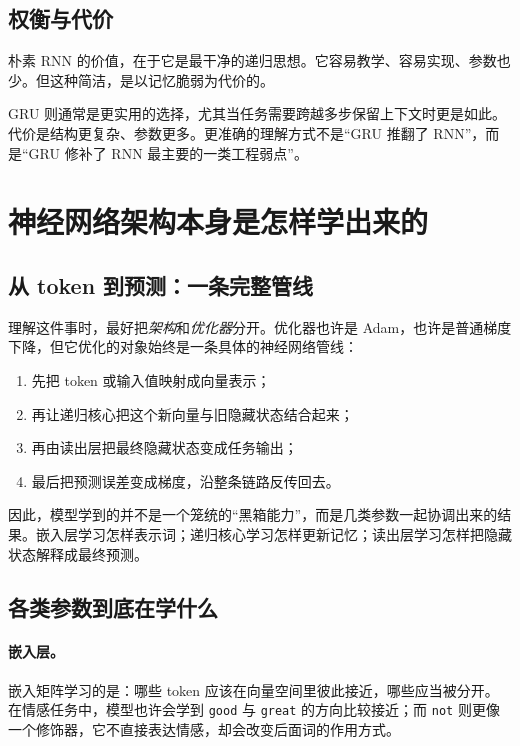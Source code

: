 \documentclass[12pt,a4paper]{ctexart}
\begin{document}
\subsection{权衡与代价}

朴素 RNN 的价值，在于它是最干净的递归思想。它容易教学、容易实现、参数也少。但这种简洁，是以记忆脆弱为代价的。

GRU 则通常是更实用的选择，尤其当任务需要跨越多步保留上下文时更是如此。代价是结构更复杂、参数更多。更准确的理解方式不是“GRU 推翻了 RNN”，而是“GRU 修补了 RNN 最主要的一类工程弱点”。

\section{神经网络架构本身是怎样学出来的}

\subsection{从 token 到预测：一条完整管线}

理解这件事时，最好把\emph{架构}和\emph{优化器}分开。优化器也许是 Adam，也许是普通梯度下降，但它优化的对象始终是一条具体的神经网络管线：

\begin{enumerate}
  \item 先把 token 或输入值映射成向量表示；
  \item 再让递归核心把这个新向量与旧隐藏状态结合起来；
  \item 再由读出层把最终隐藏状态变成任务输出；
  \item 最后把预测误差变成梯度，沿整条链路反传回去。
\end{enumerate}

因此，模型学到的并不是一个笼统的“黑箱能力”，而是几类参数一起协调出来的结果。嵌入层学习怎样表示词；递归核心学习怎样更新记忆；读出层学习怎样把隐藏状态解释成最终预测。

\subsection{各类参数到底在学什么}

\paragraph{嵌入层。}
嵌入矩阵学习的是：哪些 token 应该在向量空间里彼此接近，哪些应当被分开。在情感任务中，模型也许会学到 \texttt{good} 与 \texttt{great} 的方向比较接近；而 \texttt{not} 则更像一个修饰器，它不直接表达情感，却会改变后面词的作用方式。
\end{document}
